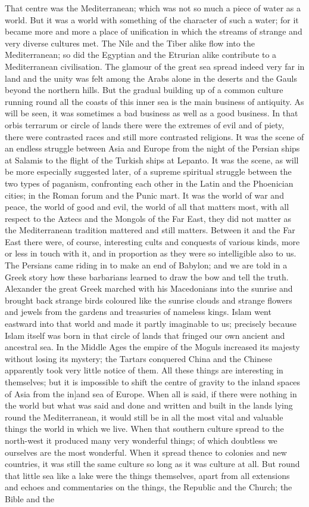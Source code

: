 That centre was the Mediterranean; which was not so much a piece of water as a world. But it was a world with something of the character of such a water; for it became more and more a place of unification in which the streams of strange and very diverse cultures met. The Nile and the Tiber alike flow into the Mediterranean; so did the Egyptian and the Etrurian alike contribute to a Mediterranean civilisation. The glamour of the great sea spread indeed very far in land and the unity was felt among the Arabs alone in the deserts and the Gauls beyond the northern hills. But the gradual building up of a common culture running round all the coasts of this inner sea is the main business of antiquity. As will be seen, it was sometimes a bad business as well as a good business. In that orbis terrarum or circle of lands there were the extremes of evil and of piety, there were contrasted races and still more contrasted religions. It was the scene of an endless struggle between Asia and Europe from the night of the Persian ships at Salamis to the flight of the Turkish ships at Lepanto. It was the scene, as will be more especially suggested later, of a supreme spiritual struggle between the two types of paganism, confronting each other in the Latin and the Phoenician cities; in the Roman forum and the Punic mart. It was the world of war and peace, the world of good and evil, the world of all that matters most, with all respect to the Aztecs and the Mongols of the Far East, they did not matter as the Mediterranean tradition mattered and still matters. Between it and the Far East there were, of course, interesting cults and conquests of various kinds, more or less in touch with it, and in proportion as they were so intelligible also to us. The Persians came riding in to make an end of Babylon; and we are told in a Greek story how these barbarians learned to draw the bow and tell the truth. Alexander the great Greek marched with his Macedonians into the sunrise and brought back strange birds coloured like the sunrise clouds and strange flowers and jewels from the gardens and treasuries of nameless kings. Islam went eastward into that world and made it partly imaginable to us; precisely because Islam itself was born in that circle of lands that fringed our own ancient and ancestral sea. In the Middle Ages the empire of the Moguls increased its majesty without losing its mystery; the Tartars conquered China and the Chinese apparently took very little notice of them. All these things are interesting in themselves; but it is impossible to shift the centre of gravity to the inland spaces of Asia from the in]and sea of Europe. When all is said, if there were nothing in the world but what was said and done and written and built in the lands lying round the Mediterranean, it would still be in all the most vital and valuable things the world in which we live. When that southern culture spread to the north-west it produced many very wonderful things; of which doubtless we ourselves are the most wonderful. When it spread thence to colonies and new countries, it was still the same culture so long as it was culture at all. But round that little sea like a lake were the things themselves, apart from all extensions and echoes and commentaries on the things, the Republic and the Church; the Bible and the 